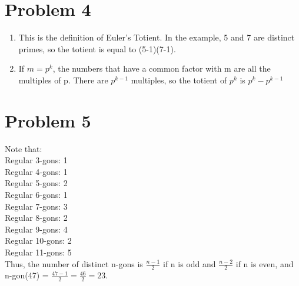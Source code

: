 \documentclass[11pt]{article}
\newenvironment{qparts}{\begin{enumerate}[{(}a{)}]}{\end{enumerate}}
\begin{document}
\section{Problem 4}
\begin{qparts}
\item
This is the definition of Euler's Totient. In the example, 5 and 7 are distinct primes, so the totient is equal to (5-1)(7-1).

\item
If $m=p^k$, the numbers that have a common factor with m are all the multiples of p. There are $p^{k-1}$ multiples, so the totient of $p^k$ is $p^k - p^{k-1}$

\end{qparts}

\section{Problem 5}
	Note that: \\
Regular 3-gons: 1 \\
Regular 4-gons: 1 \\
Regular 5-gons: 2 \\
Regular 6-gons: 1 \\
Regular 7-gons: 3 \\
Regular 8-gons: 2 \\
Regular 9-gons: 4 \\
Regular 10-gons: 2 \\
Regular 11-gons: 5 \\

Thus, the number of distinct n-gons is \textbf{$\frac{n-1}{2}$} if n is odd and \textbf{$\frac{n-2}{2}$} if n is even, and n-gon(47) = $\frac{47-1}{2} = \frac{46}{2} = 23$.
\end{document}

